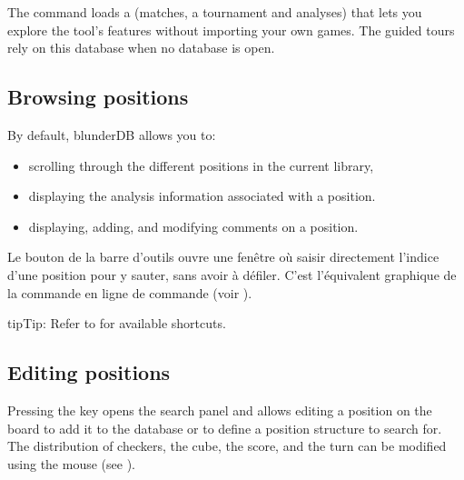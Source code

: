 \documentclass[letterpaper,10pt,english]{sphinxmanual}
\begin{document}
\sphinxAtStartPar
The  command loads a  (matches, a tournament and analyses) that lets you explore the tool’s features without importing your own games. The guided tours rely on this database when no database is open.


\subsection{Browsing positions}
\label{\detokenize{manuel:navigation-dans-les-positions}}\label{\detokenize{manuel:navigation-positions}}
\sphinxAtStartPar
By default, blunderDB allows you to:
\begin{itemize}
\item {} 
\sphinxAtStartPar
scrolling through the different positions in the current library,

\item {} 
\sphinxAtStartPar
displaying the analysis information associated with a position.

\item {} 
\sphinxAtStartPar
displaying, adding, and modifying comments on a position.

\end{itemize}

\sphinxAtStartPar
Le bouton  de la barre d’outils ouvre une fenêtre où
saisir directement l’indice d’une position pour y sauter, sans avoir à
défiler. C’est l’équivalent graphique de la commande \sphinxcode{\sphinxupquote{{[}number{]}}} en ligne de
commande (voir {\hyperref[\detokenize{cmd_mode:cmd-positions}]{}}).

\begin{sphinxadmonition}{tip}{Tip:}
\sphinxAtStartPar
Refer to {\hyperref[\detokenize{raccourcis:raccourcis}]{}} for available shortcuts.
\end{sphinxadmonition}


\subsection{Editing positions}
\label{\detokenize{manuel:edition-de-positions}}\label{\detokenize{manuel:edition-positions}}
\sphinxAtStartPar
Pressing the  key opens the search panel and allows editing a position on the board to add it to the database or to define a position structure to search for. The distribution of checkers, the cube, the score, and the turn can be modified using the mouse (see {\hyperref[\detokenize{guide_utilisateur:guide-edit-position}]{}}).
\end{document}
